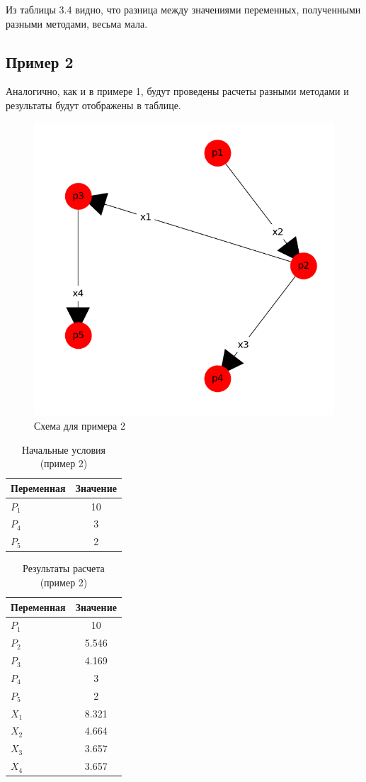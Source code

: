 Из таблицы 3.4 видно, что разница между значениями переменных, полученными разными методами, весьма мала.

\subsection{Пример 2}
Аналогично, как и в примере 1, будут проведены расчеты разными методами и результаты будут отображены в таблице.

\begin{figure}[h]
  \center\includegraphics[width=0.7\linewidth]{picts/example2/1.png}
  \caption{Схема для примера 2}
  \label{fig:example_1}
\end{figure}


\begin{table}[h!]
  \centering
    \begin{tabular}{| l | c |}
    \hline
    Переменная & Значение \\ \hline
    $ P_1 $ & 10 \\ \hline
    $ P_4 $ & 3 \\ \hline
    $ P_5 $ & 2 \\ \hline

    \end{tabular}
  \caption{Начальные условия (пример 2)}
\end{table}

\begin{table}[h!]
  \centering
    \begin{tabular}{| l | c |}
    \hline
    Переменная & Значение \\ \hline
    $ P_1 $ & 10 \\ \hline
    $ P_2 $ & 5.546 \\ \hline
    $ P_3 $ & 4.169 \\ \hline
    $ P_4 $ & 3 \\ \hline
    $ P_5 $ & 2 \\ \hline
    $ X_1 $ & 8.321 \\ \hline
    $ X_2 $ & 4.664 \\ \hline
    $ X_3 $ & 3.657 \\ \hline
    $ X_4 $ & 3.657 \\ \hline
    
    \end{tabular}
  \caption{Результаты расчета (пример 2)}
\end{table}

